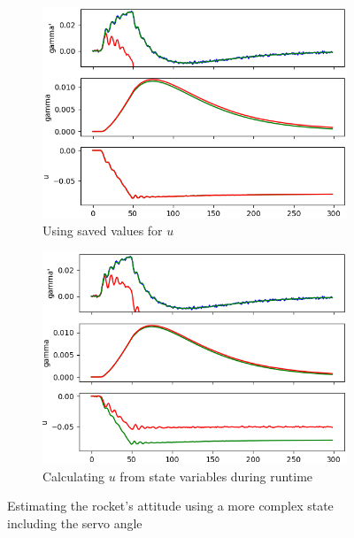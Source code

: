 \documentclass[a4paper]{article}
\begin{document}
\begin{figure}[b]
\centering
\begin{subfigure}[t]{0.48\textwidth}
\centering
\includegraphics[width=\textwidth]{kalman_attitude_servo_Q0_01_usaved.png}
\caption{Using saved values for $u$} \label{fig:attitude_Q001_usaved}
\end{subfigure}
\begin{subfigure}[t]{0.48\textwidth}
\centering
\includegraphics[width=\textwidth]{kalman_attitude_servo_Q0_01_ulive.png} 
\caption{Calculating $u$ from state variables during runtime} \label{fig:attitude_Q001_ulive}
\end{subfigure}
\caption{Estimating the rocket's attitude using a more complex state including the servo angle} \label{fig:attitude_Q001}
\end{figure}
\end{document}
